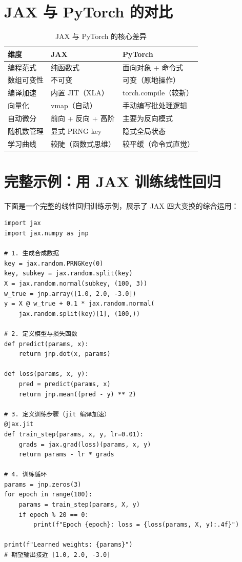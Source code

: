 \documentclass[12pt,a4paper]{article}
\begin{document}
\section{JAX 与 PyTorch 的对比}

\begin{table}[htbp]
\centering
\caption{JAX 与 PyTorch 的核心差异}
\label{tab:comparison}
\begin{tabular}{@{}lll@{}}
\toprule
\textbf{维度}       & \textbf{JAX}              & \textbf{PyTorch}           \\
\midrule
编程范式       & 纯函数式                 & 面向对象 + 命令式           \\
数组可变性     & 不可变                   & 可变（原地操作）             \\
编译加速       & 内置 JIT（XLA）           & torch.compile（较新）       \\
向量化         & vmap（自动）              & 手动编写批处理逻辑            \\
自动微分       & 前向 + 反向 + 高阶       & 主要为反向模式               \\
随机数管理     & 显式 PRNG key            & 隐式全局状态                 \\
学习曲线       & 较陡（函数式思维）        & 较平缓（命令式直觉）          \\
\bottomrule
\end{tabular}
\end{table}

\section{完整示例：用 JAX 训练线性回归}

下面是一个完整的线性回归训练示例，展示了 JAX 四大变换的综合运用：

\begin{lstlisting}
import jax
import jax.numpy as jnp

# 1. 生成合成数据
key = jax.random.PRNGKey(0)
key, subkey = jax.random.split(key)
X = jax.random.normal(subkey, (100, 3))
w_true = jnp.array([1.0, 2.0, -3.0])
y = X @ w_true + 0.1 * jax.random.normal(
    jax.random.split(key)[1], (100,))

# 2. 定义模型与损失函数
def predict(params, x):
    return jnp.dot(x, params)

def loss(params, x, y):
    pred = predict(params, x)
    return jnp.mean((pred - y) ** 2)

# 3. 定义训练步骤（jit 编译加速）
@jax.jit
def train_step(params, x, y, lr=0.01):
    grads = jax.grad(loss)(params, x, y)
    return params - lr * grads

# 4. 训练循环
params = jnp.zeros(3)
for epoch in range(100):
    params = train_step(params, X, y)
    if epoch % 20 == 0:
        print(f"Epoch {epoch}: loss = {loss(params, X, y):.4f}")

print(f"Learned weights: {params}")
# 期望输出接近 [1.0, 2.0, -3.0]
\end{lstlisting}
\end{document}
